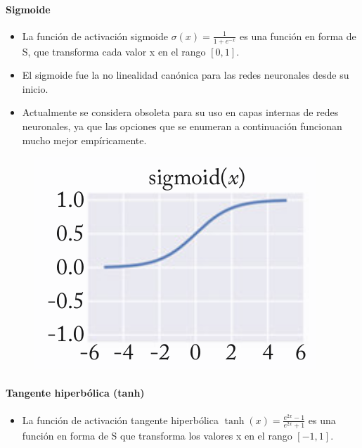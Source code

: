 \paragraph{Sigmoide}
\begin{itemize}
\item La función de activación sigmoide $\sigma(x) = \frac{1}{1+e^{-x}}$ es una función en forma de S, que transforma cada valor x en el rango $[0, 1]$.
\item El sigmoide fue la no linealidad canónica para las redes neuronales desde su inicio.
\item Actualmente se considera obsoleta para su uso en capas internas de redes neuronales, ya que las opciones que se enumeran a continuación funcionan mucho mejor empíricamente.
\end{itemize}

\begin{figure}[htb]
	\centering
	 \includegraphics[scale=0.3]{pics/sigmoid2.png}
\end{figure}

\paragraph{Tangente hiperbólica (tanh)}
\begin{itemize}
\item La función de activación tangente hiperbólica $\operatorname{tanh}(x) = \frac{e^{2x}-1}{e^{2x}+1}$ es una función en forma de S que transforma los valores x en el rango $[-1, 1]$.
\end{itemize}

